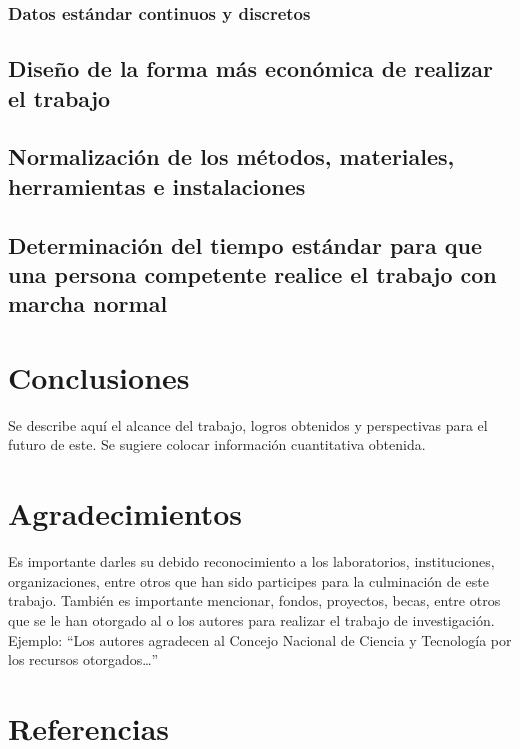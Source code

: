     \subsubsection{Datos estándar continuos y discretos}
    \subsection{Diseño de la forma más económica de realizar el trabajo}
    
    \subsection{Normalización de los métodos, materiales, herramientas e instalaciones}
    
    \subsection{Determinación del tiempo estándar para que una persona competente realice el trabajo con marcha normal}
    
    
    
    \section{Conclusiones}
    
    Se describe aquí el alcance del trabajo, logros obtenidos y perspectivas para el futuro de este. Se sugiere colocar información cuantitativa obtenida.
    
    \section{Agradecimientos}
    
    Es importante darles su debido reconocimiento a los laboratorios, instituciones, organizaciones, entre otros que han sido participes para la culminación de este trabajo. También es importante mencionar, fondos, proyectos, becas, entre otros que se le han otorgado al o los autores para realizar el trabajo de investigación. Ejemplo: “Los autores agradecen al Concejo Nacional de Ciencia y Tecnología por los recursos otorgados…”
    
    \section*{Referencias}
    
    
